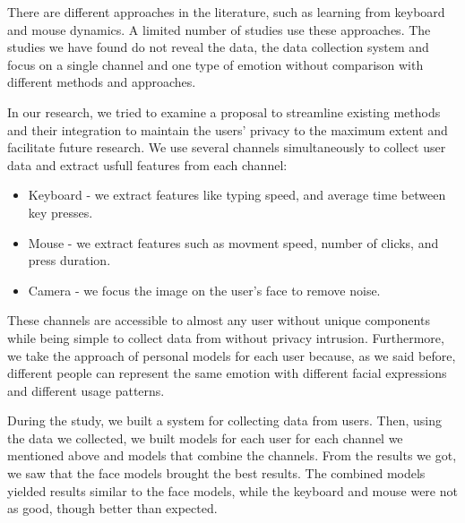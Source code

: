 \documentclass[../main.tex]{subfiles}
\begin{document}
There are different approaches in the literature, such as learning from keyboard and mouse dynamics. 
A limited number of studies use these approaches. The studies we have found do not reveal the data, 
the data collection system and focus on a single channel and one type of emotion without comparison with different methods and approaches.

In our research, we tried to examine a proposal to streamline existing methods and their integration to maintain the users' 
privacy to the maximum extent and facilitate future research. We use several channels simultaneously to collect user data and extract 
usfull features from each channel:

\begin{itemize}
    \item Keyboard - we extract features like typing speed, and average time between key presses.
    \item Mouse - we extract features such as movment speed, number of clicks, and press duration.
    \item Camera - we focus the image on the user’s face to remove noise.  
\end{itemize}

These channels are accessible to almost any user without unique components while being simple to collect data from without privacy intrusion. 
Furthermore, we take the approach of personal models for each user because, as we said before, different people can represent the same emotion 
with different facial expressions and different usage patterns.

During the study, we built a system for collecting data from users. 
Then, using the data we collected, we built models for each user for each channel we mentioned above and models that combine the channels. 
From the results we got, we saw that the face models brought the best results. The combined models yielded results similar to the face models,
while the keyboard and mouse were not as good, though better than expected.
\end{document}
